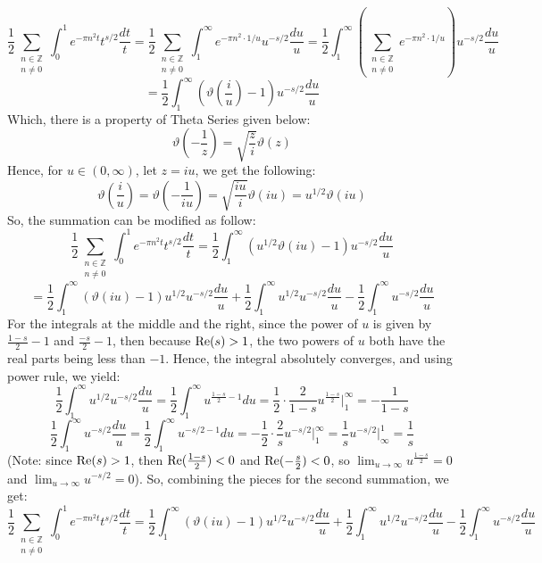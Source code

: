 \documentclass{article}
\begin{document}
$$\frac{1}{2}\sum_{\substack{n\in\mathbb{Z}\\n\neq 0}}\int_{0}^{1}e^{-\pi n^2t}t^{s/2}\frac{dt}{t} = \frac{1}{2}\sum_{\substack{n\in\mathbb{Z}\\n\neq 0}}\int_{1}^{\infty}e^{-\pi n^2\cdot 1/u}u^{-s/2}\frac{du}{u} = \frac{1}{2}\int_{1}^{\infty}\left(\sum_{\substack{n\in\mathbb{Z}\\n\neq 0}}e^{-\pi n^2\cdot 1/u}\right)u^{-s/2}\frac{du}{u}$$
$$ = \frac{1}{2}\int_{1}^{\infty}\left(\vartheta\left(\frac{i}{u}\right)-1\right)u^{-s/2}\frac{du}{u}$$
Which, there is a property of Theta Series given below:
$$\vartheta\left(-\frac{1}{z}\right)=\sqrt{\frac{z}{i}}\vartheta(z)$$
Hence, for $u\in(0,\infty)$, let $z=iu$, we get the following:
$$\vartheta\left(\frac{i}{u}\right)=\vartheta\left(-\frac{1}{iu}\right) = \sqrt{\frac{iu}{i}}\vartheta(iu) = u^{1/2}\vartheta(iu)$$
So, the summation can be modified as follow:
$$\frac{1}{2}\sum_{\substack{n\in\mathbb{Z}\\n\neq 0}}\int_{0}^{1}e^{-\pi n^2t}t^{s/2}\frac{dt}{t} = \frac{1}{2}\int_{1}^{\infty}\left(u^{1/2}\vartheta(iu)-1\right)u^{-s/2}\frac{du}{u}$$
$$ = \frac{1}{2}\int_{1}^{\infty}(\vartheta(iu)-1)u^{1/2}u^{-s/2}\frac{du}{u} + \frac{1}{2}\int_{1}^{\infty}u^{1/2}u^{-s/2}\frac{du}{u}-\frac{1}{2}\int_{1}^{\infty}u^{-s/2}\frac{du}{u}$$
For the integrals at the middle and the right, since the power of $u$ is given by $\frac{1-s}{2}-1$ and $\frac{-s}{2}-1$, then because $\textmd{Re}(s)>1$, the two powers of $u$ both have the real parts being less than $-1$. Hence, the integral absolutely converges, and using power rule, we yield:
$$\frac{1}{2}\int_{1}^{\infty}u^{1/2}u^{-s/2}\frac{du}{u} = \frac{1}{2}\int_{1}^{\infty}u^{\frac{1-s}{2}-1}du = \frac{1}{2}\cdot\frac{2}{1-s}u^{\frac{1-s}{2}}\bigg|_{1}^{\infty} = -\frac{1}{1-s}$$
$$\frac{1}{2}\int_{1}^{\infty}u^{-s/2}\frac{du}{u}=\frac{1}{2}\int_{1}^{\infty}u^{-s/2-1}du = -\frac{1}{2}\cdot\frac{2}{s}u^{-s/2}\bigg|_{1}^{\infty} = \frac{1}{s}u^{-s/2}\bigg|_{\infty}^{1} = \frac{1}{s}$$
(Note: since $\textmd{Re}(s)>1$, then $\textmd{Re}(\frac{1-s}{2})<0$ and $\textmd{Re}(-\frac{s}{2})<0$, so $\lim_{u\rightarrow\infty}u^{\frac{1-s}{2}}=0$ and $\lim_{u\rightarrow\infty}u^{-s/2}=0$).
So, combining the pieces for the second summation, we get:
$$\frac{1}{2}\sum_{\substack{n\in\mathbb{Z}\\n\neq 0}}\int_{0}^{1}e^{-\pi n^2t}t^{s/2}\frac{dt}{t} = \frac{1}{2}\int_{1}^{\infty}(\vartheta(iu)-1)u^{1/2}u^{-s/2}\frac{du}{u} + \frac{1}{2}\int_{1}^{\infty}u^{1/2}u^{-s/2}\frac{du}{u}-\frac{1}{2}\int_{1}^{\infty}u^{-s/2}\frac{du}{u}$$
\end{document}
